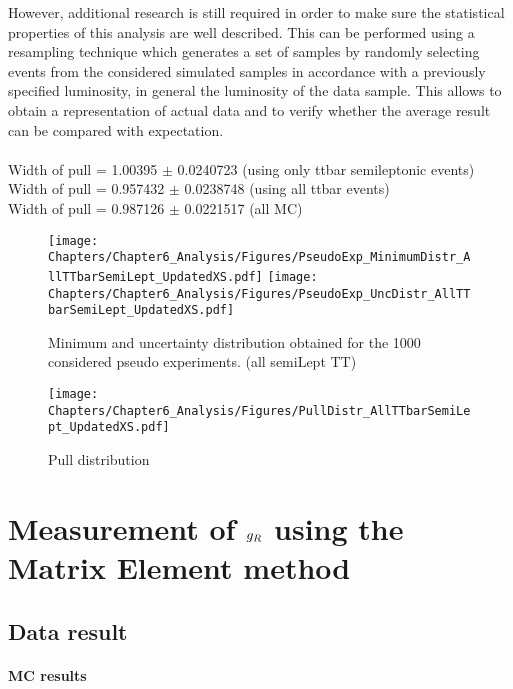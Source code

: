 However, additional research is still required in order to make sure the statistical properties of this analysis are well described.
This can be performed using a resampling technique which generates a set of samples by randomly selecting events from the considered simulated samples in accordance with a previously specified luminosity, in general the luminosity of the data sample.
This allows to obtain a representation of actual data and to verify whether the average result can be compared with expectation.
\\
\\
Width of pull = 1.00395 $\pm$ 0.0240723 (using only ttbar semileptonic events)\\
Width of pull = 0.957432 $\pm$ 0.0238748 (using all ttbar events)\\
Width of pull = 0.987126 $\pm$ 0.0221517 (all MC)

\begin{figure}[h!t]
 \centering
 \texttt{[image: Chapters/Chapter6\_Analysis/Figures/PseudoExp\_MinimumDistr\_AllTTbarSemiLept\_UpdatedXS.pdf]}
 \texttt{[image: Chapters/Chapter6\_Analysis/Figures/PseudoExp\_UncDistr\_AllTTbarSemiLept\_UpdatedXS.pdf]}
 \caption{Minimum and uncertainty distribution obtained for the 1000 considered pseudo experiments. (all semiLept TT)}  \label{fig::MinAndUnc}
\end{figure}

\begin{figure}[h!t]
 \centering
 \texttt{[image: Chapters/Chapter6\_Analysis/Figures/PullDistr\_AllTTbarSemiLept\_UpdatedXS.pdf]}
 \caption{Pull distribution} \label{fig::PullDistr}
\end{figure}

\section{Measurement of $g_{R}$ using the Matrix Element method} \label{sec::gRMeas}

\subsection{Data result}
\paragraph{MC results } \hfill \\

